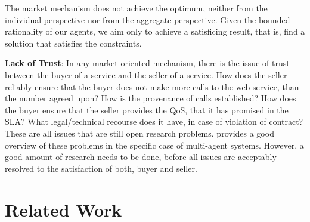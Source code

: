 \documentclass[10pt,journal,compsoc]{IEEEtran}
\begin{document}
The market mechanism does not achieve the optimum, neither from the individual perspective nor from the aggregate perspective. Given the bounded rationality of our agents, we aim only to achieve a satisficing result, that is, find a solution that satisfies the constraints. 

\textbf{Lack of Trust}: In any market-oriented mechanism, there is the issue of trust between the buyer of a service and the seller of a service. How does the seller reliably ensure that the buyer does not make more calls to the web-service, than the number agreed upon? How is the provenance of calls established? How does the buyer ensure that the seller provides the QoS, that it has promised in the SLA? What legal/technical recourse does it have, in case of violation of contract? These are all issues that are still open research problems. \cite{Ramchurn2005Trust} provides a good overview of these problems in the specific case of multi-agent systems. However, a good amount of research needs to be done, before all issues are acceptably resolved to the satisfaction of both, buyer and seller.\\

\section{Related Work}
    
\end{document}
